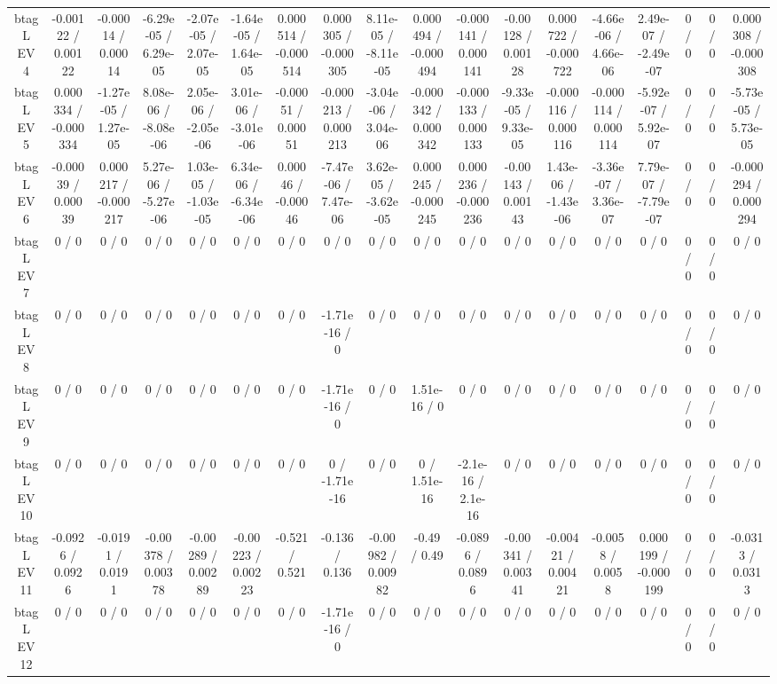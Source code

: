\documentclass[10pt]{article}
\begin{document}
\begin{table}[htbp]
\begin{center}
\begin{tabular}{|c|c|c|c|c|c|c|c|c|c|c|c|c|c|c|c|c|c|}
  btag L EV 4 & -0.00122 / 0.00122 & -0.00014 / 0.00014 & -6.29e-05 / 6.29e-05 & -2.07e-05 / 2.07e-05 & -1.64e-05 / 1.64e-05 & 0.000514 / -0.000514 & 0.000305 / -0.000305 & 8.11e-05 / -8.11e-05 & 0.000494 / -0.000494 & -0.000141 / 0.000141 & -0.00128 / 0.00128 & 0.000722 / -0.000722 & -4.66e-06 / 4.66e-06 & 2.49e-07 / -2.49e-07 & 0 / 0 & 0 / 0 & 0.000308 / -0.000308 \\ 
  btag L EV 5 & 0.000334 / -0.000334 & -1.27e-05 / 1.27e-05 & 8.08e-06 / -8.08e-06 & 2.05e-06 / -2.05e-06 & 3.01e-06 / -3.01e-06 & -0.00051 / 0.00051 & -0.000213 / 0.000213 & -3.04e-06 / 3.04e-06 & -0.000342 / 0.000342 & -0.000133 / 0.000133 & -9.33e-05 / 9.33e-05 & -0.000116 / 0.000116 & -0.000114 / 0.000114 & -5.92e-07 / 5.92e-07 & 0 / 0 & 0 / 0 & -5.73e-05 / 5.73e-05 \\ 
  btag L EV 6 & -0.00039 / 0.00039 & 0.000217 / -0.000217 & 5.27e-06 / -5.27e-06 & 1.03e-05 / -1.03e-05 & 6.34e-06 / -6.34e-06 & 0.00046 / -0.00046 & -7.47e-06 / 7.47e-06 & 3.62e-05 / -3.62e-05 & 0.000245 / -0.000245 & 0.000236 / -0.000236 & -0.00143 / 0.00143 & 1.43e-06 / -1.43e-06 & -3.36e-07 / 3.36e-07 & 7.79e-07 / -7.79e-07 & 0 / 0 & 0 / 0 & -0.000294 / 0.000294 \\ 
  btag L EV 7 & 0 / 0 & 0 / 0 & 0 / 0 & 0 / 0 & 0 / 0 & 0 / 0 & 0 / 0 & 0 / 0 & 0 / 0 & 0 / 0 & 0 / 0 & 0 / 0 & 0 / 0 & 0 / 0 & 0 / 0 & 0 / 0 & 0 / 0 \\ 
  btag L EV 8 & 0 / 0 & 0 / 0 & 0 / 0 & 0 / 0 & 0 / 0 & 0 / 0 & -1.71e-16 / 0 & 0 / 0 & 0 / 0 & 0 / 0 & 0 / 0 & 0 / 0 & 0 / 0 & 0 / 0 & 0 / 0 & 0 / 0 & 0 / 0 \\ 
  btag L EV 9 & 0 / 0 & 0 / 0 & 0 / 0 & 0 / 0 & 0 / 0 & 0 / 0 & -1.71e-16 / 0 & 0 / 0 & 1.51e-16 / 0 & 0 / 0 & 0 / 0 & 0 / 0 & 0 / 0 & 0 / 0 & 0 / 0 & 0 / 0 & 0 / 0 \\ 
  btag L EV 10 & 0 / 0 & 0 / 0 & 0 / 0 & 0 / 0 & 0 / 0 & 0 / 0 & 0 / -1.71e-16 & 0 / 0 & 0 / 1.51e-16 & -2.1e-16 / 2.1e-16 & 0 / 0 & 0 / 0 & 0 / 0 & 0 / 0 & 0 / 0 & 0 / 0 & 0 / 0 \\ 
  btag L EV 11 & -0.0926 / 0.0926 & -0.0191 / 0.0191 & -0.00378 / 0.00378 & -0.00289 / 0.00289 & -0.00223 / 0.00223 & -0.521 / 0.521 & -0.136 / 0.136 & -0.00982 / 0.00982 & -0.49 / 0.49 & -0.0896 / 0.0896 & -0.00341 / 0.00341 & -0.00421 / 0.00421 & -0.0058 / 0.0058 & 0.000199 / -0.000199 & 0 / 0 & 0 / 0 & -0.0313 / 0.0313 \\ 
  btag L EV 12 & 0 / 0 & 0 / 0 & 0 / 0 & 0 / 0 & 0 / 0 & 0 / 0 & -1.71e-16 / 0 & 0 / 0 & 0 / 0 & 0 / 0 & 0 / 0 & 0 / 0 & 0 / 0 & 0 / 0 & 0 / 0 & 0 / 0 & 0 / 0 \\ 

\end{tabular}
\end{center}
\end{table}
\end{document}
